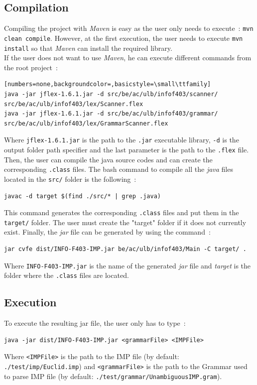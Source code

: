 \documentclass[a4paper,11pt]{article}
\begin{document}
  \subsection{Compilation}
    Compiling the project with \textit{Maven} is easy as the user only needs to execute~: \verb|mvn clean compile|. However, at the first execution, the user needs to execute \verb|mvn install| so that \textit{Maven} can install the required library.\\
    If the user does not want to use \textit{Maven}, he can execute different commands from the root project~:
    \begin{lstlisting}[numbers=none,backgroundcolor=,basicstyle=\small\ttfamily]
java -jar jflex-1.6.1.jar -d src/be/ac/ulb/infof403/scanner/ src/be/ac/ulb/infof403/lex/Scanner.flex
java -jar jflex-1.6.1.jar -d src/be/ac/ulb/infof403/grammar/ src/be/ac/ulb/infof403/lex/GrammarScanner.flex
    \end{lstlisting}
    Where \verb|jflex-1.6.1.jar| is the path to the \verb|.jar| executable library,  \verb|-d| is the output folder path specifier and the last parameter is the path to the \verb|.flex| file.\\
    Then, the user can compile the java source codes and can create the corresponding \verb|.class| files. The bash command to compile all the \textit{java} files located in the \verb|src/| folder is the following~:
    \begin{verbatim}
javac -d target $(find ./src/* | grep .java)
    \end{verbatim}
    This command generates the corresponding \verb|.class| files and put them in the \verb|target/| folder. The user must create the "target" folder if it does not currently exist. Finally, the \textit{jar} file can be generated by using the command~:
    \begin{verbatim}
jar cvfe dist/INFO-F403-IMP.jar be/ac/ulb/infof403/Main -C target/ .
    \end{verbatim}
    Where \verb|INFO-F403-IMP.jar| is the name of the generated \textit{jar} file and \textit{target} is the folder where the \verb|.class| files are located.
    
  \subsection{Execution}
    To execute the resulting jar file, the user only has to type~:
    \begin{verbatim}
java -jar dist/INFO-F403-IMP.jar <grammarFile> <IMPFile>
    \end{verbatim}
    Where \verb|<IMPFile>| is the path to the IMP file (by default: \verb|./test/imp/Euclid.imp|) and \verb|<grammarFile>| is the path to the Grammar used to parse IMP file (by default: \verb|./test/grammar/UnambiguousIMP.gram|).
    
\end{document}

